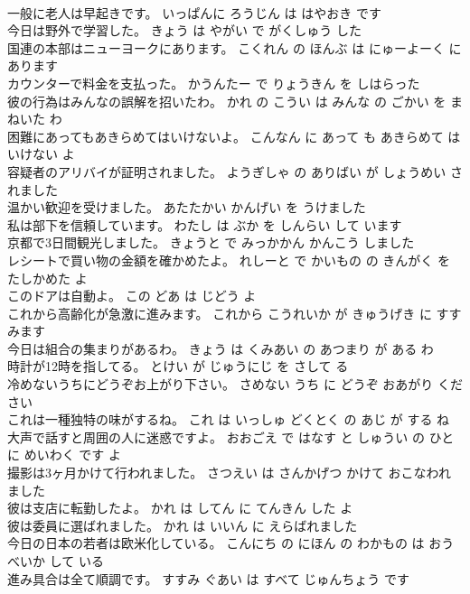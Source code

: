 \documentclass[8pt]{extreport}
\begin{document}
\begin{CJK}{UTF8}{min}
\\	一般に老人は早起きです。	いっぱんに ろうじん は はやおき です 
\\	今日は野外で学習した。	きょう は やがい で がくしゅう した 
\\	国連の本部はニューヨークにあります。	こくれん の ほんぶ は にゅーよーく に あります 
\\	カウンターで料金を支払った。	かうんたー で りょうきん を しはらった 
\\	彼の行為はみんなの誤解を招いたわ。	かれ の こうい は みんな の ごかい を まねいた わ 
\\	困難にあってもあきらめてはいけないよ。	こんなん に あって も あきらめて は いけない よ 
\\	容疑者のアリバイが証明されました。	ようぎしゃ の ありばい が しょうめい されました 
\\	温かい歓迎を受けました。	あたたかい かんげい を うけました 
\\	私は部下を信頼しています。	わたし は ぶか を しんらい して います 
\\	京都で3日間観光しました。	きょうと で みっかかん かんこう しました 
\\	レシートで買い物の金額を確かめたよ。	れしーと で かいもの の きんがく を たしかめた よ 
\\	このドアは自動よ。	この どあ は じどう よ 
\\	これから高齢化が急激に進みます。	これから こうれいか が きゅうげき に すすみます 
\\	今日は組合の集まりがあるわ。	きょう は くみあい の あつまり が ある わ 
\\	時計が12時を指してる。	とけい が じゅうにじ を さして る 
\\	冷めないうちにどうぞお上がり下さい。	さめない うち に どうぞ おあがり ください 
\\	これは一種独特の味がするね。	これ は いっしゅ どくとく の あじ が する ね 
\\	大声で話すと周囲の人に迷惑ですよ。	おおごえ で はなす と しゅうい の ひと に めいわく です よ 
\\	撮影は3ヶ月かけて行われました。	さつえい は さんかげつ かけて おこなわれました 
\\	彼は支店に転勤したよ。	かれ は してん に てんきん した よ 
\\	彼は委員に選ばれました。	かれ は いいん に えらばれました 
\\	今日の日本の若者は欧米化している。	こんにち の にほん の わかもの は おうべいか して いる 
\\	進み具合は全て順調です。	すすみ ぐあい は すべて じゅんちょう です 

\end{CJK}
\end{document}
